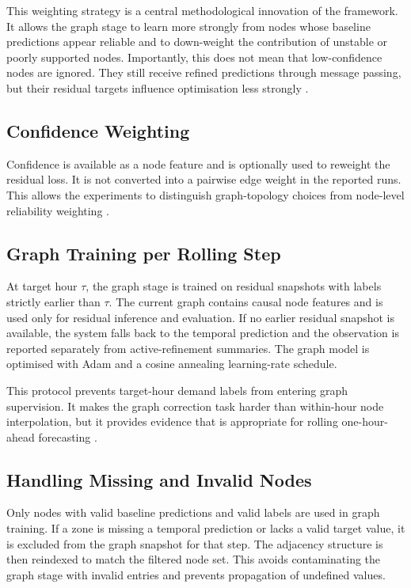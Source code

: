 \documentclass[12pt,a4paper]{report}
\begin{document}
This weighting strategy is a central methodological innovation of the framework. It allows the graph stage to learn more strongly from nodes whose baseline predictions appear reliable and to down-weight the contribution of unstable or poorly supported nodes. Importantly, this does not mean that low-confidence nodes are ignored. They still receive refined predictions through message passing, but their residual targets influence optimisation less strongly \cite{park2022confidenceaware,wang2024gnnuncertaintysurvey}.

\subsection{Confidence Weighting}

Confidence is available as a node feature and is optionally used to reweight the residual loss. It is not converted into a pairwise edge weight in the reported runs. This allows the experiments to distinguish graph-topology choices from node-level reliability weighting \cite{west2025weighted,hu2025uncertaintygnn}.

\subsection{Graph Training per Rolling Step}

At target hour \(\tau\), the graph stage is trained on residual snapshots with labels strictly earlier than \(\tau\). The current graph contains causal node features and is used only for residual inference and evaluation. If no earlier residual snapshot is available, the system falls back to the temporal prediction and the observation is reported separately from active-refinement summaries. The graph model is optimised with Adam and a cosine annealing learning-rate schedule.

This protocol prevents target-hour demand labels from entering graph supervision. It makes the graph correction task harder than within-hour node interpolation, but it provides evidence that is appropriate for rolling one-hour-ahead forecasting \cite{hewamalage2022pitfalls,cerqueira2020evaluating}.

\subsection{Handling Missing and Invalid Nodes}

Only nodes with valid baseline predictions and valid labels are used in graph training. If a zone is missing a temporal prediction or lacks a valid target value, it is excluded from the graph snapshot for that step. The adjacency structure is then reindexed to match the filtered node set. This avoids contaminating the graph stage with invalid entries and prevents propagation of undefined values.
\end{document}
